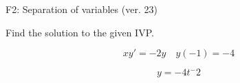 \begin{exercise}
  \begin{exerciseTitle}F2: Separation of variables (ver. 23)\end{exerciseTitle}
  \begin{exerciseStatement}
    
Find the solution to the given IVP.

    
\[xy'= -2 y \hspace{1em} y( -1 ) = -4\]

  \end{exerciseStatement}
  \begin{exerciseAnswer}
    
\[y= -4 t^ -2\]

  \end{exerciseAnswer}
\end{exercise}